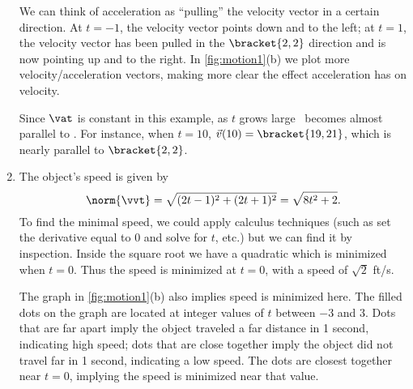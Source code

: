 \begin{example}
\begin{enumerate}
	We can think of acceleration as ``pulling'' the velocity vector in a certain direction. At $t=-1$, the velocity vector points down and to the left; at $t=1$, the velocity vector has been pulled in the $\bracket{2,2}$ direction and is now pointing up and to the right. In \autoref{fig:motion1}(b) we plot more velocity/acceleration vectors, making more clear the effect acceleration has on velocity.
	
	Since $\vat$ is constant in this example, as $t$ grows large \vvt\ becomes almost parallel to \vat. For instance, when $t=10$, $\vec v(10) =\bracket{19,21}$, which is nearly parallel to $\bracket{2,2}$.
	
	\item		The object's speed is given by 
	\[\norm{\vvt} = \sqrt{(2t-1)^2+(2t+1)^2} =\sqrt{8t^2+2}.\] To find the minimal speed, we could apply calculus techniques (such as set the derivative equal to 0 and solve for $t$, etc.) but we can find it by inspection. Inside the square root we have a quadratic which is minimized when $t=0$. Thus the speed is minimized at $t=0$, with a speed of $\sqrt{2}$ ft/s.
	
	The graph in \autoref{fig:motion1}(b) also implies speed is minimized here. The filled dots on the graph are located at integer values of $t$ between $-3$ and 3. Dots that are far apart imply the object traveled a far distance in 1 second, indicating high speed; dots that are close together imply the object did not travel far in 1 second, indicating a low speed. The dots are closest together near $t=0$, implying the speed is minimized near that value.
\end{enumerate}
\end{example}

